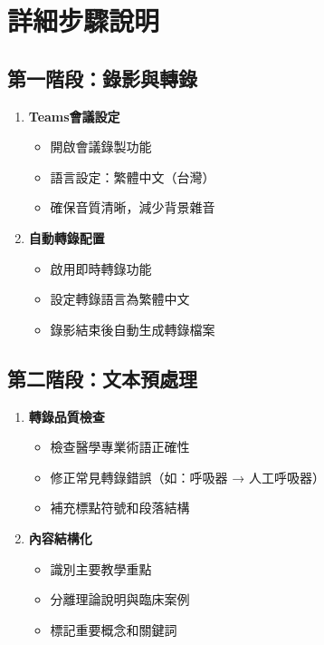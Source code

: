 \documentclass[12pt,a4paper]{article}
\begin{document}
\section{詳細步驟說明}

\subsection{第一階段：錄影與轉錄}
\begin{enumerate}[itemsep=0.5em]
    \item \textbf{Teams會議設定}
    \begin{itemize}
        \item 開啟會議錄製功能
        \item 語言設定：繁體中文（台灣）
        \item 確保音質清晰，減少背景雜音
    \end{itemize}
    
    \item \textbf{自動轉錄配置}
    \begin{itemize}
        \item 啟用即時轉錄功能
        \item 設定轉錄語言為繁體中文
        \item 錄影結束後自動生成轉錄檔案
    \end{itemize}
\end{enumerate}

\subsection{第二階段：文本預處理}
\begin{enumerate}[itemsep=0.5em]
    \item \textbf{轉錄品質檢查}
    \begin{itemize}
        \item 檢查醫學專業術語正確性
        \item 修正常見轉錄錯誤（如：呼吸器 → 人工呼吸器）
        \item 補充標點符號和段落結構
    \end{itemize}
    
    \item \textbf{內容結構化}
    \begin{itemize}
        \item 識別主要教學重點
        \item 分離理論說明與臨床案例
        \item 標記重要概念和關鍵詞
    \end{itemize}
\end{enumerate}
\end{document}
